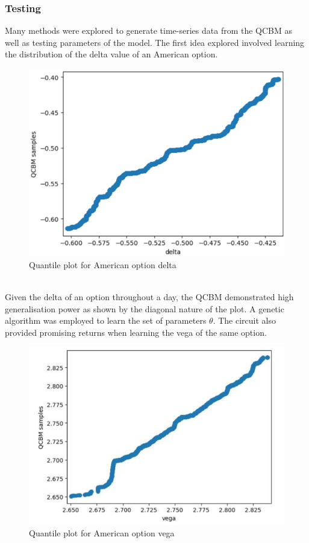 \documentclass[12pt]{article}
\numberwithin{equation}{section}
\begin{document}
\subsubsection{Testing}
Many methods were explored to generate time-series data from the QCBM as well as 
testing parameters of the model. The first idea explored involved learning the 
distribution of the delta value of an American option.
\begin{figure}[h]
    \centering
    \includegraphics[scale=0.24]{QCBM-delta.png}
    \caption{Quantile plot for American option delta}
\end{figure}
\\
Given the delta of an option throughout a day, the QCBM demonstrated high
generalisation power as shown by the diagonal nature of the plot. A genetic 
algorithm was employed to learn the set of parameters $\theta$.
The circuit also provided promising returns when learning the vega of the same 
option. 
\begin{figure}[h]
    \centering
    \includegraphics[scale=0.75]{QCBM-vega.png}
    \caption{Quantile plot for American option vega}
\end{figure}
\end{document}
